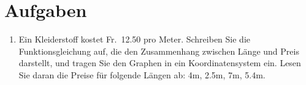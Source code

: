\documentclass[%
11pt,%
twoside,%
titlepage,%
german,%
headsepline%
]{scrartcl}
\newcommand{\rede}[1]{``#1''}
\newcommand{\begriff}[1]{``#1''}
\begin{document}
{\settowidth{\labelwidth}{\labelitemi}
\setlength{\leftmargini}{\labelwidth} \addtolength{\leftmargini}{\labelsep}




\section*{Aufgaben}
{\settowidth{\labelwidth}{9.9}
\setlength{\leftmargini}{\labelwidth} \addtolength{\leftmargini}{\labelsep}
\renewcommand{\labelenumi}{\thesection.\arabic{enumi}}
\begin{enumerate}

\item \label{aufg:linfkt1:stoff} Ein Kleiderstoff kostet Fr.~12.50 pro Meter. Schreiben Sie die Funktionsgleichung auf, die den Zusammenhang zwischen L\"ange und Preis darstellt, und tragen Sie den Graphen in ein Koordinatensystem ein. Lesen Sie daran die Preise f\"ur folgende L\"angen ab: 4\unit{m}, 2.5\unit{m}, 7\unit{m}, 5.4\unit{m}.


\end{enumerate}}}
\end{document}

